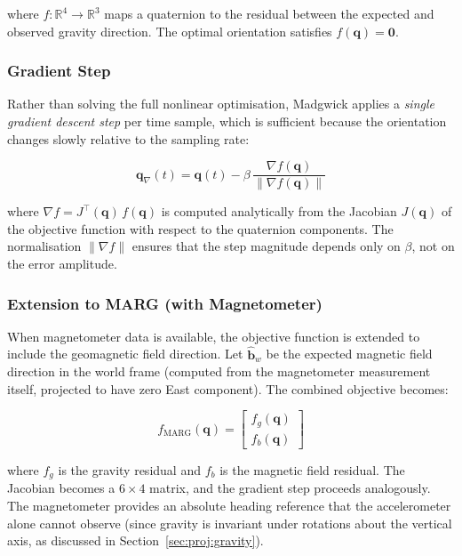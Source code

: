 \noindent where $f : \mathbb{R}^4 \to \mathbb{R}^3$ maps a quaternion to the
residual between the expected and observed gravity direction.  The optimal
orientation satisfies $f(\mathbf{q}) = \mathbf{0}$.

\subsubsection{Gradient Step}

Rather than solving the full nonlinear optimisation, Madgwick applies a
\emph{single gradient descent step} per time sample, which is sufficient
because the orientation changes slowly relative to the sampling rate:

\begin{equation}
  \mathbf{q}_{\nabla}(t)
  = \mathbf{q}(t)
    - \beta\,\frac{\nabla f(\mathbf{q})}{\|\nabla f(\mathbf{q})\|}
  \label{eq:gradient_step}
\end{equation}

\noindent where $\nabla f = J^\top\!(\mathbf{q})\, f(\mathbf{q})$ is
computed analytically from the Jacobian $J(\mathbf{q})$ of the objective
function with respect to the quaternion components.  The normalisation
$\|\nabla f\|$ ensures that the step magnitude depends only on $\beta$, not
on the error amplitude.

\subsubsection{Extension to MARG (with Magnetometer)}

When magnetometer data is available, the objective function is extended to
include the geomagnetic field direction.  Let $\hat{\mathbf{b}}_w$ be the
expected magnetic field direction in the world frame (computed from the
magnetometer measurement itself, projected to have zero East component).
The combined objective becomes:

\begin{equation}
  f_{\text{MARG}}(\mathbf{q})
  = \begin{bmatrix}
      f_g(\mathbf{q}) \\[2pt]
      f_b(\mathbf{q})
    \end{bmatrix}
  \label{eq:objective_marg}
\end{equation}

\noindent where $f_g$ is the gravity residual and $f_b$ is the magnetic field
residual.  The Jacobian becomes a $6 \times 4$ matrix, and the gradient step
proceeds analogously.  The magnetometer provides an absolute heading
reference that the accelerometer alone cannot observe (since gravity is
invariant under rotations about the vertical axis, as discussed in
Section~\ref{sec:proj:gravity}).

